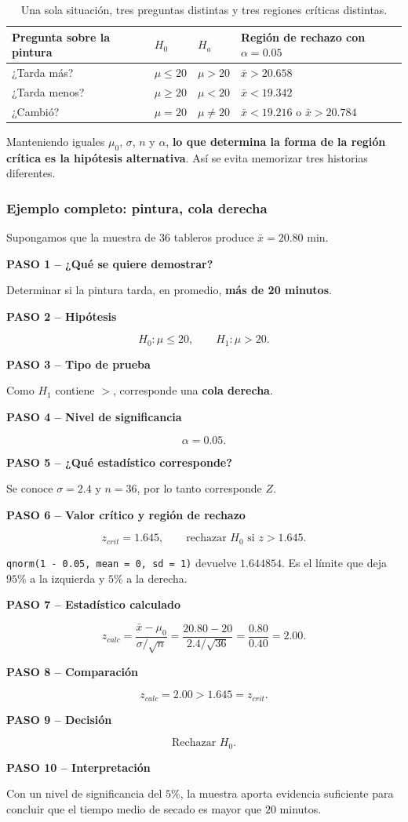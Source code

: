 \documentclass[11pt,a4paper]{article}
\newcommand{\paso}[2]{\par\medskip\noindent\textbf{PASO #1 -- #2}\par}
\begin{document}
\begin{table}[H]
\centering
\small
\begin{tabularx}{\textwidth}{p{3.1cm}p{3.2cm}p{3.2cm}X}
\toprule
Pregunta sobre la pintura & $H_0$ & $H_a$ & Región de rechazo con $\alpha=0.05$\\
\midrule
¿Tarda más? & $\mu\le20$ & $\mu>20$ & $\bar{x}>20.658$\\
¿Tarda menos? & $\mu\ge20$ & $\mu<20$ & $\bar{x}<19.342$\\
¿Cambió? & $\mu=20$ & $\mu\neq20$ & $\bar{x}<19.216$ o $\bar{x}>20.784$\\
\bottomrule
\end{tabularx}
\caption{Una sola situación, tres preguntas distintas y tres regiones críticas distintas.}
\end{table}

\begin{regla}
Manteniendo iguales $\mu_0$, $\sigma$, $n$ y $\alpha$, \textbf{lo que determina la forma de la región crítica es la hipótesis alternativa}. Así se evita memorizar tres historias diferentes.
\end{regla}

\subsubsection{Ejemplo completo: pintura, cola derecha}

Supongamos que la muestra de $36$ tableros produce $\bar{x}=20.80$ min.

\paso{1}{¿Qué se quiere demostrar?}
Determinar si la pintura tarda, en promedio, \textbf{más de 20 minutos}.
\paso{2}{Hipótesis}
\[H_0:\mu\le20,\qquad H_1:\mu>20.\]
\paso{3}{Tipo de prueba}
Como $H_1$ contiene $>$, corresponde una \textbf{cola derecha}.
\paso{4}{Nivel de significancia}
\[\alpha=0.05.\]
\paso{5}{¿Qué estadístico corresponde?}
Se conoce $\sigma=2.4$ y $n=36$, por lo tanto corresponde $Z$.
\paso{6}{Valor crítico y región de rechazo}
\[z_{crit}=1.645,\qquad \text{rechazar }H_0\text{ si }z>1.645.\]
\begin{calculor}
\texttt{qnorm(1 - 0.05, mean = 0, sd = 1)} devuelve $1.644854$. Es el límite que deja $95\%$ a la izquierda y $5\%$ a la derecha.
\end{calculor}
\paso{7}{Estadístico calculado}
\[
z_{calc}=\frac{\bar{x}-\mu_0}{\sigma/\sqrt n}
=\frac{20.80-20}{2.4/\sqrt{36}}=\frac{0.80}{0.40}=2.00.
\]
\paso{8}{Comparación}
\[z_{calc}=2.00>1.645=z_{crit}.\]
\paso{9}{Decisión}
\[\boxed{\text{Rechazar }H_0}.\]
\paso{10}{Interpretación}
Con un nivel de significancia del $5\%$, la muestra aporta evidencia suficiente para concluir que el tiempo medio de secado es mayor que $20$ minutos.
\end{document}
